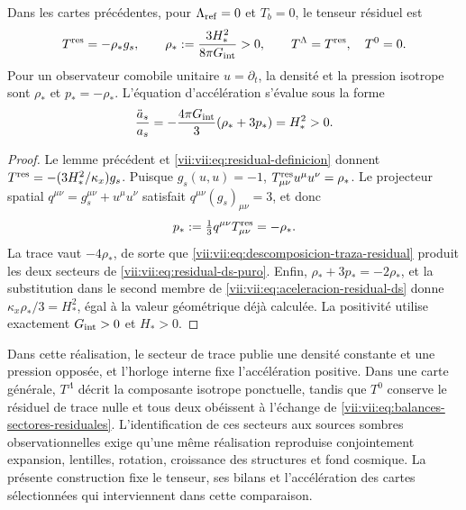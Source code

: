 \begin{theorem}
\label{vii:vii:thm:residual-ds-aceleracion}
Dans les cartes précédentes, pour \(\Lambda_{\rm ref}=0\) et \(T_b=0\), le tenseur résiduel est
\begin{equation}
 T^{\rm res}=-\rho_*g_s,\qquad
 \rho_*:=\frac{3H_*^2}{8\pi G_{\rm int}}>0,
 \qquad T^\Lambda=T^{\rm res},\quad T^0=0.
 \label{vii:vii:eq:residual-ds-puro}
\end{equation}
Pour un observateur comobile unitaire \(u=\partial_t\), la densité
et la pression isotrope sont \(\rho_*\) et \(p_*=-\rho_*\).
L'équation d'accélération s'évalue sous la forme
\begin{equation}
 \frac{\ddot a_s}{a_s}
 =-\frac{4\pi G_{\rm int}}3(\rho_*+3p_*)=H_*^2>0.
 \label{vii:vii:eq:aceleracion-residual-ds}
\end{equation}
\end{theorem}
\begin{proof}
Le lemme précédent et \eqref{vii:vii:eq:residual-definicion} donnent \(T^{\rm res}=-(3H_*^2/\kappa_x)g_s\). Puisque \(g_s(u,u)=-1\), \(T^{\rm res}_{\mu\nu}u^\mu u^\nu=\rho_*\). Le projecteur spatial \(q^{\mu\nu}=g_s^{\mu\nu}+u^\mu u^\nu\) satisfait \(q^{\mu\nu}(g_s)_{\mu\nu}=3\), et donc
\[
 p_*:=\tfrac13q^{\mu\nu}T^{\rm res}_{\mu\nu}=-\rho_*.
\]
La trace vaut \(-4\rho_*\), de sorte que
\eqref{vii:vii:eq:descomposicion-traza-residual} produit les deux secteurs
de \eqref{vii:vii:eq:residual-ds-puro}. Enfin,
\(\rho_*+3p_*=-2\rho_*\), et la substitution dans le second membre
de \eqref{vii:vii:eq:aceleracion-residual-ds} donne
\(\kappa_x\rho_*/3=H_*^2\), égal à la valeur géométrique déjà calculée.
La positivité utilise exactement \(G_{\rm int}>0\) et \(H_*>0\).
\end{proof}

Dans cette réalisation, le secteur de trace publie une densité constante et une pression opposée, et l'horloge interne fixe l'accélération positive. Dans une carte générale, \(T^\Lambda\) décrit la composante isotrope ponctuelle, tandis que \(T^0\) conserve le résiduel de trace nulle et tous deux obéissent à l'échange de \eqref{vii:vii:eq:balances-sectores-residuales}. L'identification de ces secteurs aux sources sombres observationnelles exige qu'une même réalisation reproduise conjointement expansion, lentilles, rotation, croissance des structures et fond cosmique. La présente construction fixe le tenseur, ses bilans et l'accélération des cartes sélectionnées qui interviennent dans cette comparaison.
